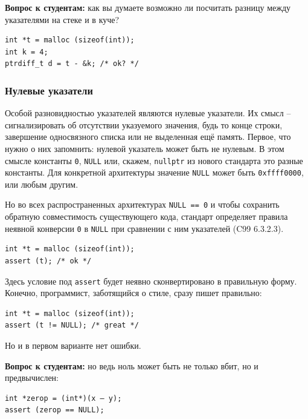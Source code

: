 \documentclass[a4paper,12pt,oneside]{article}
\newif\ifanswers
\begin{document}
\textbf{Вопрос к студентам:} как вы думаете возможно ли посчитать разницу между указателями на стеке и в куче?

\begin{lstlisting}
int *t = malloc (sizeof(int));
int k = 4;
ptrdiff_t d = t - &k; /* ok? */
\end{lstlisting}

\ifanswers
Правильный ответ: разумеется да, адресная арифметика по стандарту прозрачна относительно того где расположена память до тех пор, пока все влезает в \lstinline!ptrdiff_t!.
\fi

\subsubsection{Нулевые указатели}\label{NullPointers}

Особой разновидностью указателей являются нулевые указатели. Их смысл -- сигнализировать об отсутствии указуемого значения, будь то конце строки, завершение односвязного списка или не выделенная ещё память. Первое, что нужно о них запомнить: нулевой указатель может быть не нулевым. В этом смысле константы \lstinline!0!, \lstinline!NULL! или, скажем, \lstinline!nullptr! из нового стандарта это разные константы. Для конкретной архитектуры значение \lstinline!NULL! может быть \lstinline!0xffff0000!, или любым другим.

Но во всех распространенных архитектурах \lstinline!NULL == 0! и чтобы сохранить обратную совместимость существующего кода, стандарт определяет правила неявной конверсии \lstinline!0! в \lstinline!NULL! при сравнении с ним указателей (C99 6.3.2.3).

\begin{lstlisting}
int *t = malloc (sizeof(int));
assert (t); /* ok */
\end{lstlisting}

Здесь условие под \lstinline!assert! будет неявно сконвертировано в правильную форму. Конечно, программист, заботящийся о стиле, сразу пишет правильно:

\begin{lstlisting}
int *t = malloc (sizeof(int));
assert (t != NULL); /* great */
\end{lstlisting}

Но и в первом варианте нет ошибки.

\textbf{Вопрос к студентам:} но ведь ноль может быть не только вбит, но и предвычислен:

\begin{lstlisting}
int *zerop = (int*)(x – y);
assert (zerop == NULL);
\end{lstlisting}
\end{document}
